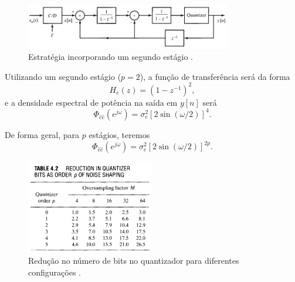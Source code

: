 \begin{frame}[allowframebreaks]
  \framebreak

  \begin{figure}[h!]
  \centering
  \includegraphics[width=0.8\textwidth]{images/oppenheim_fig466.png}
  \caption{Estratégia incorporando um segundo estágio \citep{oppenheim2009}.}
  \label{fig:oppenheim_fig466}
  \end{figure}

  \framebreak

  Utilizando um segundo estágio ($p=2$), a função de transferência será da forma
  \begin{equation}
  H_e (z) = (1 - z^{-1})^2 , 
  \end{equation}
  e a densidade espectral de potência na saída em $y[n]$ será
  \begin{equation}
  \Phi_{\hat{e}\hat{e}} (e^{j\omega}) = \sigma_e^2 [2 \sin (\omega /2)]^4 .
  \end{equation}

  \vspace{2ex}
  De forma geral, para $p$ estágios, teremos
  \begin{equation}
  \Phi_{\hat{e}\hat{e}} (e^{j\omega}) = \sigma_e^2 [2 \sin (\omega /2)]^{2p} .
  \end{equation}

  \framebreak

  \begin{figure}[h!]
  \centering
  \includegraphics[width=0.5\textwidth]{images/oppenheim_tab42.png}
  \caption{Redução no número de bits no quantizador para diferentes configurações \citep{oppenheim2009}.}
  \label{fig:oppenheim_tab42}
  \end{figure}

\end{frame}

